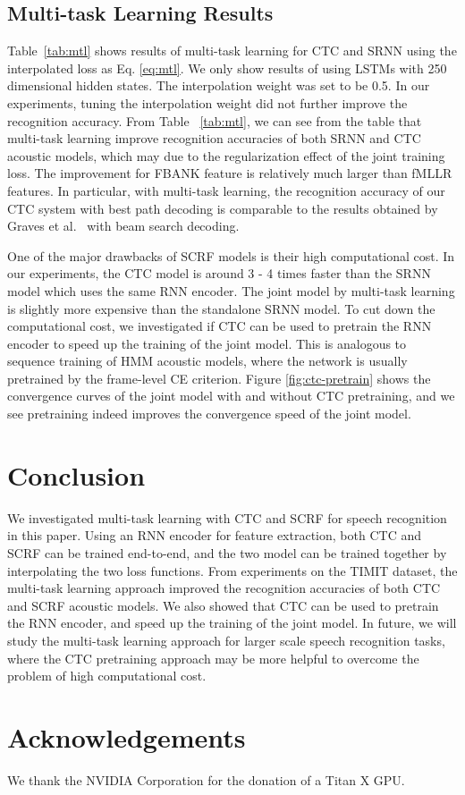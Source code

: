 \documentclass[a4paper]{article}
\begin{document}
\subsection{Multi-task Learning Results}

Table~\ref{tab:mtl} shows results of multi-task learning for CTC and SRNN using the interpolated loss as Eq. \eqref{eq:mtl}. We only show results of using LSTMs with 250 dimensional hidden states. The interpolation weight was set to be 0.5. In our experiments, tuning the interpolation weight did not further improve the recognition accuracy. From Table ~\ref{tab:mtl}, we can see from the table that multi-task learning improve recognition accuracies of both SRNN and CTC acoustic models, which may due to the regularization effect of the joint training loss. The improvement for FBANK feature is relatively much larger than fMLLR features. In particular, with multi-task learning, the recognition accuracy of our CTC system with best path decoding is comparable to the results obtained by Graves et al.~\cite{graves2013speech} with beam search decoding. 

One of the major drawbacks of SCRF models is their high computational cost. In our experiments, the CTC model is around 3 - 4 times faster than the SRNN model which uses the same RNN encoder. The joint model by multi-task learning is slightly more expensive than the standalone SRNN model. To cut down the computational cost, we investigated if CTC can be used to pretrain the RNN encoder to speed up the training of the joint model. This is analogous to sequence training of HMM acoustic models, where the network is usually pretrained by the frame-level CE criterion. Figure \ref{fig:ctc-pretrain} shows the convergence curves of the joint model with and without CTC pretraining, and we see  pretraining indeed improves the convergence speed of the joint model. %
 

\section{Conclusion}

We investigated multi-task learning with CTC and SCRF for speech recognition in this paper. Using an RNN encoder for feature extraction, both CTC and SCRF can be trained end-to-end, and the two model can be trained together by interpolating the two loss functions. From experiments on the TIMIT dataset, the multi-task learning approach improved the recognition accuracies of both CTC and SCRF acoustic models. We also showed that CTC can be used to pretrain the RNN encoder, and speed up the training of the joint model. In future, we will study the multi-task learning approach for larger scale speech recognition tasks, where the CTC pretraining approach may be more helpful to overcome the problem of high computational cost. 


\section{Acknowledgements}

We thank the NVIDIA Corporation for the donation of a Titan X GPU.



\end{document}
